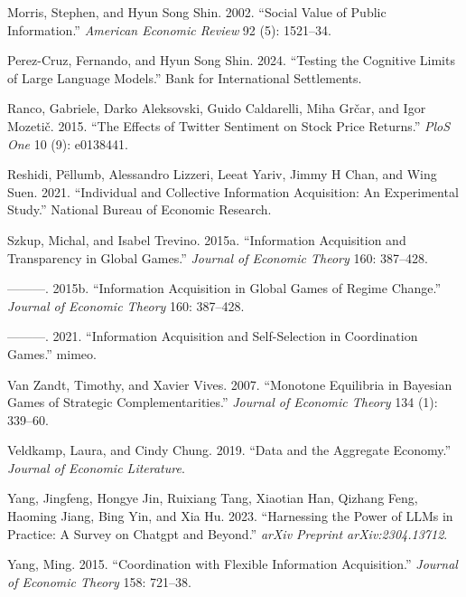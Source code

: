 \documentclass[
]{article}
\newlength{\cslhangindent}
\newenvironment{CSLReferences}[2] %
 {\begin{list}{}{%
  \setlength{\itemindent}{0pt}
  \setlength{\leftmargin}{0pt}
  \setlength{\parsep}{0pt}
  \ifodd #1
   \setlength{\leftmargin}{\cslhangindent}
   \setlength{\itemindent}{-1\cslhangindent}
  \fi
  \setlength{\itemsep}{#2\baselineskip}}}
 {\end{list}}
\theoremstyle{definition}
\theoremstyle{plain}
\theoremstyle{remark}
\begin{document}
\begin{CSLReferences}{1}{0}
Morris, Stephen, and Hyun Song Shin. 2002. {``Social Value of Public
Information.''} \emph{American Economic Review} 92 (5): 1521--34.

Perez-Cruz, Fernando, and Hyun Song Shin. 2024. {``Testing the Cognitive
Limits of Large Language Models.''} Bank for International Settlements.

Ranco, Gabriele, Darko Aleksovski, Guido Caldarelli, Miha Grčar, and
Igor Mozetič. 2015. {``The Effects of Twitter Sentiment on Stock Price
Returns.''} \emph{PloS One} 10 (9): e0138441.

Reshidi, Pëllumb, Alessandro Lizzeri, Leeat Yariv, Jimmy H Chan, and
Wing Suen. 2021. {``Individual and Collective Information Acquisition:
An Experimental Study.''} National Bureau of Economic Research.

Szkup, Michal, and Isabel Trevino. 2015a. {``Information Acquisition and
Transparency in Global Games.''} \emph{Journal of Economic Theory} 160:
387--428.

---------. 2015b. {``Information Acquisition in Global Games of Regime
Change.''} \emph{Journal of Economic Theory} 160: 387--428.

---------. 2021. {``Information Acquisition and Self-Selection in
Coordination Games.''} mimeo.

Van Zandt, Timothy, and Xavier Vives. 2007. {``Monotone Equilibria in
Bayesian Games of Strategic Complementarities.''} \emph{Journal of
Economic Theory} 134 (1): 339--60.

Veldkamp, Laura, and Cindy Chung. 2019. {``Data and the Aggregate
Economy.''} \emph{Journal of Economic Literature}.

Yang, Jingfeng, Hongye Jin, Ruixiang Tang, Xiaotian Han, Qizhang Feng,
Haoming Jiang, Bing Yin, and Xia Hu. 2023. {``Harnessing the Power of
LLMs in Practice: A Survey on Chatgpt and Beyond.''} \emph{arXiv
Preprint arXiv:2304.13712}.

Yang, Ming. 2015. {``Coordination with Flexible Information
Acquisition.''} \emph{Journal of Economic Theory} 158: 721--38.

\end{CSLReferences}
\end{document}
